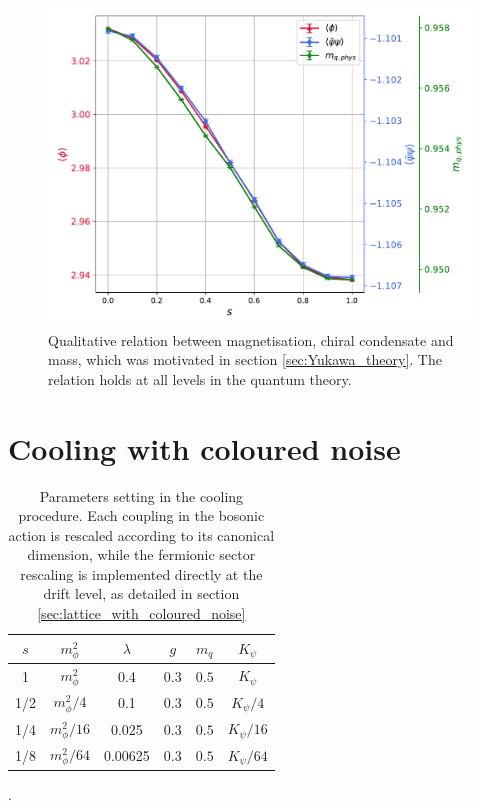 \begin{figure}
    \centering
    \includegraphics[scale=0.7]{figures/slide_broken/mag_cond.pdf}
    \caption[Relation between magnetisation, condensate and mass]{Qualitative relation between magnetisation, chiral condensate and mass, which was motivated in section \ref{sec:Yukawa_theory}. The relation holds at all levels in the quantum theory.}
    \label{fig:interpolation_relation_phi_cond_mass}
\end{figure}
\newpage

\section{Cooling with coloured noise}

\begin{table}
    \centering
    \begin{tabular}{cccccc}
        \toprule
        $s$ & $m_\phi^2$ & $\lambda$ & $g$ & $m_q$& $K_\psi$ \\
        \midrule 
        1 & $m_\phi^2$ & 0.4 & 0.3 & $0.5$ & $K_\psi$ \\
        1/2 & $m_\phi^2/4$ & 0.1 & 0.3 & $0.5$ & $K_\psi/4$ \\
        1/4 & $m_\phi^2/16$ & 0.025 & 0.3 & $0.5$ & $K_\psi/16$ \\
        1/8 & $m_\phi^2/64$ & 0.00625 & 0.3 & $0.5$ & $K_\psi/64$ \\
        \bottomrule
    \end{tabular}
    \caption[Parameters cooling]{Parameters setting in the cooling procedure. Each coupling in the bosonic action is rescaled according to its canonical dimension, while the fermionic sector rescaling is implemented directly at the drift level, as detailed in section \ref{sec:lattice_with_coloured_noise}}.
    \label{tab:params_cooling}
\end{table}


